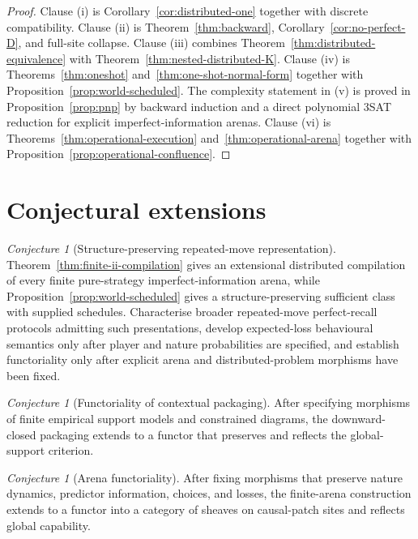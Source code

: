\documentclass[11pt]{article}
\theoremstyle{plain}
\theoremstyle{definition}
\theoremstyle{remark}
\newtheorem{conjecture}[theorem]{Conjecture}
\begin{document}
\begin{proof}
Clause (i) is Corollary~\ref{cor:distributed-one} together with discrete
compatibility. Clause (ii) is Theorem~\ref{thm:backward},
Corollary~\ref{cor:no-perfect-D}, and full-site collapse. Clause (iii) combines
Theorem~\ref{thm:distributed-equivalence} with
Theorem~\ref{thm:nested-distributed-K}. Clause (iv) is
Theorems~\ref{thm:oneshot} and~\ref{thm:one-shot-normal-form} together with
Proposition~\ref{prop:world-scheduled}. The complexity statement in (v) is
proved in Proposition~\ref{prop:pnp} by backward induction and a direct
polynomial 3SAT reduction for explicit imperfect-information arenas. Clause (vi) is
Theorems~\ref{thm:operational-execution} and~\ref{thm:operational-arena} together
with Proposition~\ref{prop:operational-confluence}.
\end{proof}

\section{Conjectural extensions}\label{sec:conjectures}

\begin{conjecture}[Structure-preserving repeated-move representation]
\label{conj:imperfect}
Theorem~\ref{thm:finite-ii-compilation} gives an extensional distributed
compilation of every finite pure-strategy imperfect-information arena, while
Proposition~\ref{prop:world-scheduled} gives a structure-preserving sufficient
class with supplied schedules. Characterise broader repeated-move perfect-recall
protocols admitting such presentations, develop expected-loss behavioural
semantics only after player and nature probabilities are specified, and
establish functoriality only after explicit arena and distributed-problem
morphisms have been fixed.
\end{conjecture}

\begin{conjecture}[Functoriality of contextual packaging]\label{conj:context}
After specifying morphisms of finite empirical support models and constrained
diagrams, the downward-closed packaging extends to a functor that preserves and
reflects the global-support criterion.
\end{conjecture}

\begin{conjecture}[Arena functoriality]\label{conj:arena-functor}
After fixing morphisms that preserve nature dynamics, predictor information,
choices, and losses, the finite-arena construction extends to a functor into a
category of sheaves on causal-patch sites and reflects global capability.
\end{conjecture}
\end{document}
